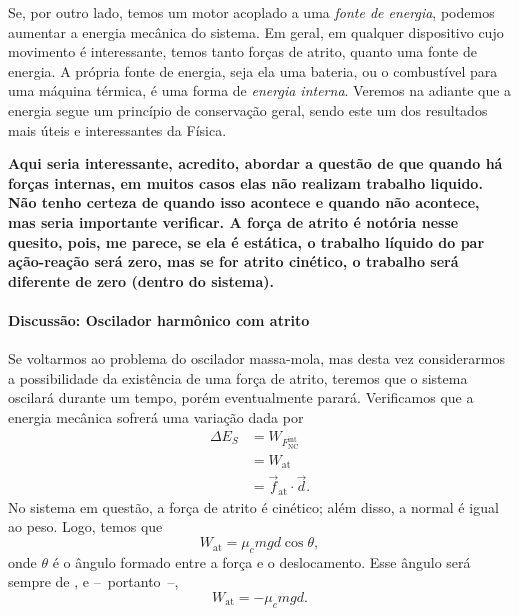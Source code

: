 Se, por outro lado, temos um motor acoplado a uma \emph{fonte de energia}, podemos aumentar a energia mecânica do sistema. Em geral, em qualquer dispositivo cujo movimento é interessante, temos tanto forças de atrito, quanto uma fonte de energia. A própria fonte de energia, seja ela uma bateria, ou o combustível para uma máquina térmica, é uma forma de \emph{energia interna}. Veremos na adiante que a energia segue um princípio de conservação geral, sendo este um dos resultados mais úteis e interessantes da Física.

\textbf{Aqui seria interessante, acredito, abordar a questão de que quando há forças internas, em muitos casos elas não realizam trabalho liquido. Não tenho certeza de quando isso acontece e quando não acontece, mas seria importante verificar. A força de atrito é notória nesse quesito, pois, me parece, se ela é estática, o trabalho líquido do par ação-reação será zero, mas se for atrito cinético, o trabalho será diferente de zero (dentro do sistema).}

\paragraph{Discussão: Oscilador harmônico com atrito}

Se voltarmos ao problema do oscilador massa-mola, mas desta vez considerarmos a possibilidade da existência de uma força de atrito, teremos que o sistema oscilará durante um tempo, porém eventualmente parará. Verificamos que a energia mecânica sofrerá uma variação dada por
\begin{align}
    \Delta E_S &= W_{F_{\textrm{NC}}^{\textrm{int}}} \\
    &= W_{\textrm{at}} \\
    &= \vec{f}_{\textrm{at}} \cdot \vec{d}.
\end{align}
%
No sistema em questão, a força de atrito é cinético; além disso, a normal é igual ao peso. Logo, temos que
\begin{equation}
    W_{\textrm{at}} = \mu_c m g d \cos \theta,
\end{equation}
%
onde $\theta$ é o ângulo formado entre a força e o deslocamento. Esse ângulo será sempre de , e --~portanto~--,
\begin{equation}
    W_{\textrm{at}} = - \mu_c m g d.
\end{equation}

